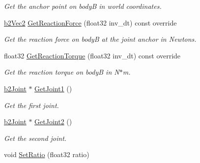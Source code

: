 \begin{DoxyCompactItemize}
\begin{DoxyCompactList}\small\item\em Get the anchor point on bodyB in world coordinates. \end{DoxyCompactList}\item 
\mbox{\label{classb2GearJoint_aa1dc4c7c58d8ee656726c372edb7abcd}} 
\hyperlink{structb2Vec2}{b2\+Vec2} \hyperlink{classb2GearJoint_aa1dc4c7c58d8ee656726c372edb7abcd}{Get\+Reaction\+Force} (float32 inv\+\_\+dt) const override
\begin{DoxyCompactList}\small\item\em Get the reaction force on bodyB at the joint anchor in Newtons. \end{DoxyCompactList}\item 
\mbox{\label{classb2GearJoint_a6c0f2f34c087085202b1a9506cd48fd1}} 
float32 \hyperlink{classb2GearJoint_a6c0f2f34c087085202b1a9506cd48fd1}{Get\+Reaction\+Torque} (float32 inv\+\_\+dt) const override
\begin{DoxyCompactList}\small\item\em Get the reaction torque on bodyB in N$\ast$m. \end{DoxyCompactList}\item 
\mbox{\label{classb2GearJoint_acd3fb38982319f387d1eb7aeddd5311f}} 
\hyperlink{classb2Joint}{b2\+Joint} $\ast$ \hyperlink{classb2GearJoint_acd3fb38982319f387d1eb7aeddd5311f}{Get\+Joint1} ()
\begin{DoxyCompactList}\small\item\em Get the first joint. \end{DoxyCompactList}\item 
\mbox{\label{classb2GearJoint_af1673b8edd80f3ae3b868c3a18b7b058}} 
\hyperlink{classb2Joint}{b2\+Joint} $\ast$ \hyperlink{classb2GearJoint_af1673b8edd80f3ae3b868c3a18b7b058}{Get\+Joint2} ()
\begin{DoxyCompactList}\small\item\em Get the second joint. \end{DoxyCompactList}\item 
\mbox{\label{classb2GearJoint_a21c867bdc00c15ade2f399d370f92636}} 
void \hyperlink{classb2GearJoint_a21c867bdc00c15ade2f399d370f92636}{Set\+Ratio} (float32 ratio)

\end{DoxyCompactItemize}

